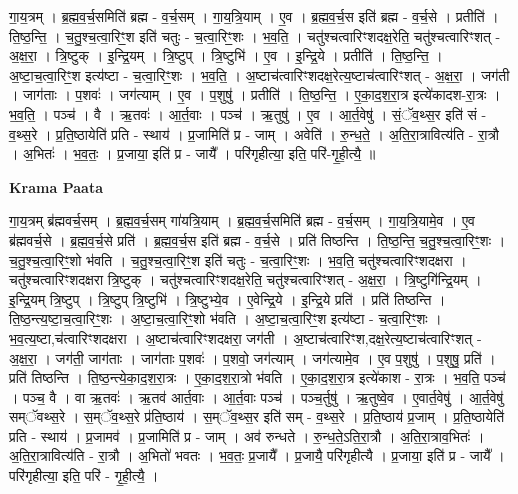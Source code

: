 \documentclass[17pt]{extarticle}
\begin{document}
गा॒य॒त्रम् । ब्र॒ह्म॒व॒र्च॒समिति॑ ब्रह्म - व॒र्च॒सम् । गा॒य॒त्रि॒याम् । ए॒व । ब्र॒ह्म॒व॒र्च॒स इति॑ ब्रह्म - व॒र्च॒से । प्रतीति॑ । ति॒ष्ठ॒न्ति॒ । च॒तु॒श्च॒त्वा॒रिꣳ॒॒श इति॑ चतुः - च॒त्वा॒रिꣳ॒॒शः । भ॒व॒ति॒ । चतु॑श्चत्वारिꣳशदक्ष॒रेति॒ चतु॑श्चत्वारिꣳशत् - अ॒क्ष॒रा॒ । त्रि॒ष्टुक् । इ॒न्द्रि॒यम् । त्रि॒ष्टुप् । त्रि॒ष्टुभि॑ । ए॒व । इ॒न्द्रि॒ये । प्रतीति॑ । ति॒ष्ठ॒न्ति॒ । अ॒ष्टा॒च॒त्वा॒रिꣳ॒॒श इत्य॑ष्टा - च॒त्वा॒रिꣳ॒॒शः । भ॒व॒ति॒ । अ॒ष्टाच॑त्वारिꣳशदक्ष॒रेत्य॒ष्टाच॑त्वारिꣳशत् - अ॒क्ष॒रा॒ । जग॑ती । जाग॑ताः । प॒शवः॑ । जग॑त्याम् । ए॒व । प॒शुषु॑ । प्रतीति॑ । ति॒ष्ठ॒न्ति॒ । ए॒का॒द॒श॒रा॒त्र इत्ये॑कादश-रा॒त्रः । भ॒व॒ति॒ । पञ्च॑ । वै । ऋ॒तवः॑ । आ॒र्त॒वाः । पञ्च॑ । ऋ॒तुषु॑ । ए॒व । आ॒र्त॒वेषु॑ । सं॒ॅव॒थ्स॒र इति॑ सं - व॒थ्स॒रे । प्र॒ति॒ष्ठायेति॑ प्रति - स्थाय॑ । प्र॒जामिति॑ प्र - जाम् । अवेति॑ । रु॒न्ध॒ते॒ । अ॒ति॒रा॒त्रावित्य॑ति - रा॒त्रौ । अ॒भितः॑ । भ॒व॒तः॒ । प्र॒जाया॒ इति॑ प्र - जायै᳚ । परि॑गृहीत्या॒ इति॒ परि॑-गृ॒ही॒त्यै॒ ॥  \newline


\textbf{Krama Paata} \newline

गा॒य॒त्रम् ब्र॑ह्मवर्च॒सम् । ब्र॒ह्म॒व॒र्च॒सम् गा॑यत्रि॒याम् । ब्र॒ह्म॒व॒र्च॒समिति॑ ब्रह्म - व॒र्च॒सम् । गा॒य॒त्रि॒यामे॒व । ए॒व ब्र॑ह्मवर्च॒से । ब्र॒ह्म॒व॒र्च॒से प्रति॑ । ब्र॒ह्म॒व॒र्च॒स इति॑ ब्रह्म - व॒र्च॒से । प्रति॑ तिष्ठन्ति । ति॒ष्ठ॒न्ति॒ च॒तु॒श्च॒त्वा॒रिꣳ॒॒शः । च॒तु॒श्च॒त्वा॒रिꣳ॒॒शो भ॑वति । च॒तु॒श्च॒त्वा॒रिꣳ॒॒श इति॑ चतुः - च॒त्वा॒रिꣳ॒॒शः । भ॒व॒ति॒ चतु॑श्चत्वारिꣳशदक्षरा । चतु॑श्चत्वारिꣳशदक्षरा त्रि॒ष्टुक् । चतु॑श्चत्वारिꣳशदक्ष॒रेति॒ चतु॑श्चत्वारिꣳशत् - अ॒क्ष॒रा॒ । त्रि॒ष्टुगि॑न्द्रि॒यम् । इ॒न्द्रि॒यम् त्रि॒ष्टुप् । त्रि॒ष्टुप् त्रि॒ष्टुभि॑ । त्रि॒ष्टुभ्ये॒व । ए॒वेन्द्रि॒ये । इ॒न्द्रि॒ये प्रति॑ । प्रति॑ तिष्ठन्ति । ति॒ष्ठ॒न्त्य॒ष्टा॒च॒त्वा॒रिꣳ॒॒शः । अ॒ष्टा॒च॒त्वा॒रिꣳ॒॒शो भ॑वति । अ॒ष्टा॒च॒त्वा॒रिꣳ॒॒श इत्य॑ष्टा - च॒त्वा॒रिꣳ॒॒शः । भ॒व॒त्य॒ष्टा,च॑त्वारिꣳशदक्षरा । अ॒ष्टाच॑त्वारिꣳशदक्षरा॒ जग॑ती । अ॒ष्टाच॑त्वारिꣳश,दक्ष॒रेत्य॒ष्टाच॑त्वारिꣳशत् - अ॒क्ष॒रा॒ । जग॑ती॒ जाग॑ताः । जाग॑ताः प॒शवः॑ । प॒शवो॒ जग॑त्याम् । जग॑त्यामे॒व । ए॒व प॒शुषु॑ । प॒शुषु॒ प्रति॑ । प्रति॑ तिष्ठन्ति । ति॒ष्ठ॒न्त्ये॒का॒द॒श॒रा॒त्रः । ए॒का॒द॒श॒रा॒त्रो भ॑वति । ए॒का॒द॒श॒रा॒त्र इत्ये॑काश - रा॒त्रः । भ॒व॒ति॒ पञ्च॑ । पञ्च॒ वै । वा ऋ॒तवः॑ । ऋ॒तव॑ आर्त॒वाः । आ॒र्त॒वाः पञ्च॑ । पञ्च॒र्तुषु॑ । ऋ॒तुष्वे॒व । ए॒वार्त॒वेषु॑ । आ॒र्त॒वेषु॑ सम्ॅवथ्स॒रे । स॒म्ॅव॒थ्स॒रे प्र॑ति॒ष्ठाय॑ । स॒म्ॅव॒थ्स॒र इति॑ सम् - व॒थ्स॒रे । प्र॒ति॒ष्ठाय॑ प्र॒जाम् । प्र॒ति॒ष्ठायेति॑ प्रति - स्थाय॑ । प्र॒जामव॑ । प्र॒जामिति॑ प्र - जाम् । अव॑ रुन्धते । रु॒न्ध॒ते॒ऽति॒रा॒त्रौ । अ॒ति॒रा॒त्राव॒भितः॑ । अ॒ति॒रा॒त्रावित्य॑ति - रा॒त्रौ । अ॒भितो॑ भवतः । भ॒व॒तः॒ प्र॒जायै᳚ । प्र॒जायै॒ परि॑गृहीत्यै । प्र॒जाया॒ इति॑ प्र - जायै᳚ । परि॑गृहीत्या॒ इति॒ परि॑ - गृ॒ही॒त्यै॒ । \newline
\end{document}
